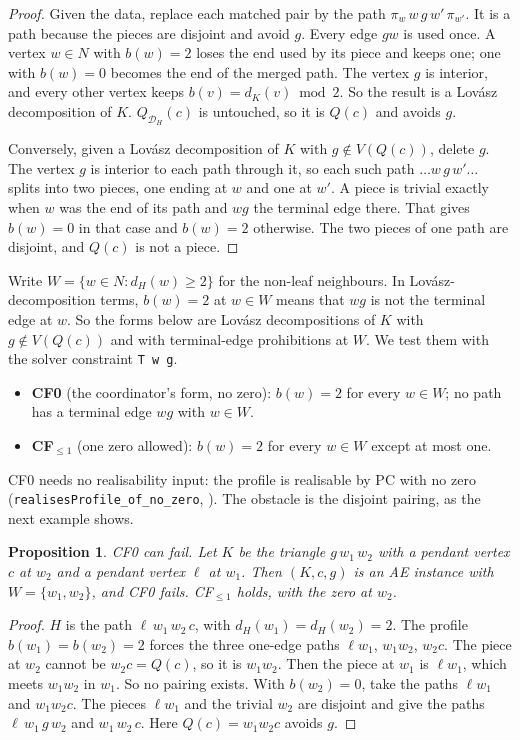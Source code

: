 \documentclass[11pt]{amsart}
\newtheorem{proposition}[theorem]{Proposition}
\theoremstyle{definition}
\newcommand{\cD}{\mathcal D}
\begin{document}
\begin{proof}
Given the data, replace each matched pair by the path $\pi_w\,w\,g\,w'\,\pi_{w'}$. It is a path
because the pieces are disjoint and avoid $g$. Every edge $gw$ is used once. A vertex $w\in N$ with $b(w)=2$ loses the end used by its piece and keeps one;
one with $b(w)=0$ becomes the end of the merged path. The vertex $g$ is interior, and every other vertex keeps
$b(v)=d_K(v)\bmod2$. So the result is a Lov\'asz decomposition of $K$.
$Q_{\cD_H}(c)$ is untouched, so it is $Q(c)$ and avoids $g$.

Conversely, given a Lov\'asz decomposition of $K$ with $g\notin V(Q(c))$, delete $g$. The vertex
$g$ is interior to each path through it, so each such path $\dots w\,g\,w'\dots$ splits into two
pieces, one ending at $w$ and one at $w'$. A piece is trivial exactly when $w$ was the end of its
path and $wg$ the terminal edge there. That gives $b(w)=0$ in that case and $b(w)=2$ otherwise.
The two pieces of one path are disjoint, and $Q(c)$ is not a piece.
\end{proof}

Write $W=\{w\in N:d_H(w)\ge2\}$ for the non-leaf neighbours. In Lov\'asz-decomposition terms, $b(w)=2$
at $w\in W$ means that $wg$ is not the terminal edge at $w$. So the forms below are Lov\'asz
decompositions of $K$ with $g\notin V(Q(c))$ and with terminal-edge prohibitions at $W$. We test
them with the solver constraint \texttt{T w g}.
\begin{itemize}
\item \textbf{CF0} (the coordinator's form, no zero): $b(w)=2$ for every $w\in W$; no path has a
terminal edge $wg$ with $w\in W$.
\item \textbf{CF$_{\le1}$} (one zero allowed): $b(w)=2$ for every $w\in W$ except at most one.
\end{itemize}
CF0 needs no realisability input: the profile is realisable by PC with no zero
(\texttt{realisesProfile\_of\_no\_zero}, \cite{C31}). The obstacle is the disjoint pairing, as the next
example shows.

\begin{proposition}\label{prop:cf0fails}
CF0 can fail. Let $K$ be the triangle $g\,w_1\,w_2$ with a pendant vertex $c$ at $w_2$ and a
pendant vertex $\ell$ at $w_1$. Then $(K,c,g)$ is an AE instance with $W=\{w_1,w_2\}$, and CF0 fails.
CF$_{\le1}$ holds, with the zero at $w_2$.
\end{proposition}

\begin{proof}
$H$ is the path $\ell\,w_1\,w_2\,c$, with $d_H(w_1)=d_H(w_2)=2$. The profile $b(w_1)=b(w_2)=2$ forces
the three one-edge paths $\ell w_1$, $w_1w_2$, $w_2c$. The piece at $w_2$ cannot be $w_2c=Q(c)$, so
it is $w_1w_2$. Then the piece at $w_1$ is $\ell w_1$, which meets $w_1w_2$ in $w_1$. So no pairing
exists. With $b(w_2)=0$, take the paths $\ell w_1$ and $w_1w_2c$. The pieces $\ell w_1$ and the
trivial $w_2$ are disjoint and give the paths $\ell\,w_1\,g\,w_2$ and $w_1\,w_2\,c$. Here
$Q(c)=w_1w_2c$ avoids $g$.
\end{proof}
\end{document}
